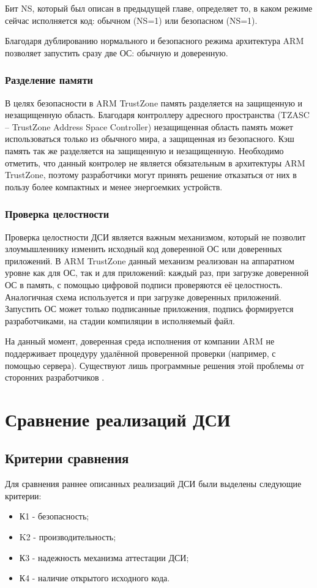 Бит NS, который был описан в предыдущей главе, определяет то, в каком режиме сейчас исполняется код: обычном (NS=1) или безопасном (NS=1).

Благодаря дублированию нормального и безопасного режима архитектура ARM позволяет запустить сразу две ОС: обычную и доверенную.

\subsubsection{Разделение памяти}

В целях безопасности в ARM TrustZone память разделяется на защищенную и незащищенную область. Благодаря контроллеру адресного пространства (TZASC -- TrustZone Address Space Controller) незащищенная область память может использоваться только из обычного мира, а защищенная из безопасного. Кэш память так же разделяется на защищенную и незащищенную. Необходимо отметить, что данный контролер не является обязательным в архитектуры ARM TrustZone, поэтому разработчики могут принять решение отказаться от них в пользу более компактных и менее энергоемких устройств.

\subsubsection{Проверка целостности}

Проверка целостности ДСИ является важным механизмом, который не позволит злоумышленнику изменить исходный код доверенной ОС или доверенных приложений. В ARM TrustZone данный механизм реализован на аппаратном уровне как для ОС, так и для приложений: каждый раз, при загрузке доверенной ОС в память, с помощью цифровой подписи проверяются её целостность. Аналогичная схема используется и при загрузке доверенных приложений. Запустить ОС может только подписанные приложения, подпись формируется разработчиками, на стадии компиляции в исполняемый файл.

На данный момент, доверенная среда исполнения от компании ARM не поддерживает процедуру удалённой проверенной проверки (например, с помощью сервера). Существуют лишь программные решения этой проблемы от сторонних разработчиков \cite{comparsion-arm-intel}.

\section{Сравнение реализаций ДСИ}

\subsection{Критерии сравнения}

Для сравнения раннее описанных реализаций ДСИ были выделены следующие критерии:

\begin{itemize}
	\item К1 - безопасность;
	\item K2 - производительность;
	\item К3 - надежность механизма аттестации ДСИ;
	\item К4 - наличие открытого исходного кода.
\end{itemize}

\pagebreak
